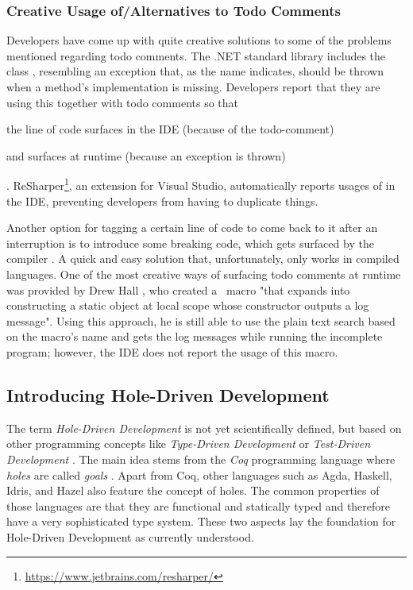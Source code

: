 \subsubsection{Creative Usage of/Alternatives to Todo Comments}
Developers have come up with quite creative solutions to some of the problems mentioned regarding todo comments.
The .NET standard library includes the class \texttt{}, resembling an exception that, as the name indicates, should be thrown when a method's implementation is missing.
Developers report that they are using this together with todo comments \cite{squires_use_2012} so that
\begin{enumerate*}[label=(\roman*)]
\item the line of code surfaces in the IDE (because of the todo-comment)
\item and surfaces at runtime (because an exception is thrown)
\end{enumerate*}.
ReSharper\footnote{\url{https://www.jetbrains.com/resharper/}}, an extension for Visual Studio, automatically reports usages of \texttt{} in the IDE, preventing developers from having to duplicate things.

Another option for tagging a certain line of code to come back to it after an interruption is to introduce some breaking code, which gets surfaced by the compiler \cite{tackabury_how_2019}.
A quick and easy solution that, unfortunately, only works in compiled languages.
One of the most creative ways of surfacing todo comments at runtime was provided by Drew Hall \cite{tackabury_how_2019}, who created a \CC\ macro "that expands into constructing a static object at local scope whose constructor outputs a log message".
Using this approach, he is still able to use the plain text search based on the macro's name and gets the log messages while running the incomplete program; however, the IDE does not report the usage of this macro.



\subsection{Introducing Hole-Driven Development}
\label{sec:introducing-hole-driven-development}
The term \emph{Hole-Driven Development} is not yet scientifically defined, but based on other programming concepts like \emph{Type-Driven Development} \cite{brady_type-driven_2017} or \emph{Test-Driven Development} \cite{mccracken_digital_1957}.
The main idea stems from the \emph{Coq} programming language where \emph{holes} are called \emph{goals} \cite{the_coq_development_team_proof_2023}.
Apart from Coq, other languages such as Agda, Haskell, Idris, and Hazel also feature the concept of holes.
The common properties of those languages are that they are functional and statically typed and therefore have a very sophisticated type system.
These two aspects lay the foundation for Hole-Driven Development as currently understood.

